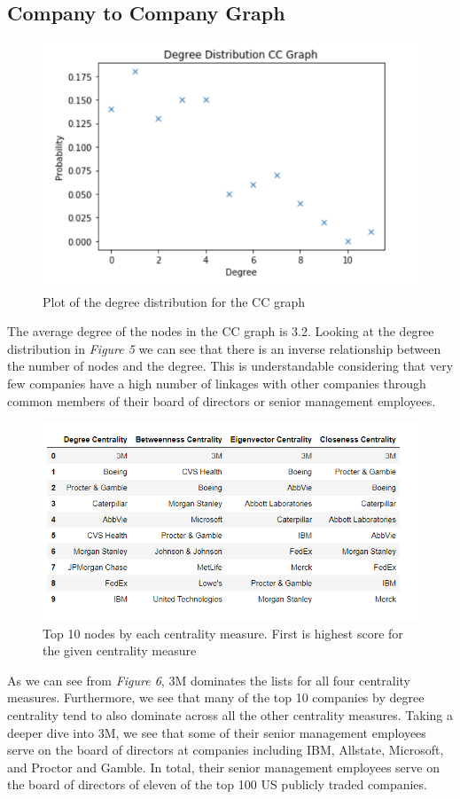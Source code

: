 \documentclass[a4paper]{article}
\begin{document}
\subsection*{Company to Company Graph}
\begin{figure}[h]
    \centering
    \includegraphics[width=.55\linewidth]{./graphs/deg_dist_CC.png}
    \caption{Plot of the degree distribution for the CC graph}
\end{figure}
The average degree of the nodes in the CC graph is 3.2. Looking at the degree distribution in \textit{Figure 5} we can see that there is an inverse relationship between the number of nodes and the degree. This is understandable considering that very few companies have a high number of linkages with other companies through common members of their board of directors or senior management employees.
\begin{figure}[h]
    \centering
    \includegraphics[width=.5\linewidth]{./graphs/centrality_CC.png}
    \caption{Top 10 nodes by each centrality measure. First is highest score for the given centrality measure}
\end{figure}
As we can see from \textit{Figure 6}, 3M dominates the lists for all four centrality measures. Furthermore, we see that many of the top 10 companies by degree centrality tend to also dominate across all the other centrality measures. Taking a deeper dive into 3M, we see that some of their senior management employees serve on the board of directors at companies including IBM, Allstate, Microsoft, and Proctor and Gamble. In total, their senior management employees serve on the board of directors of eleven of the top 100 US publicly traded companies. 
\par 
\end{document}
